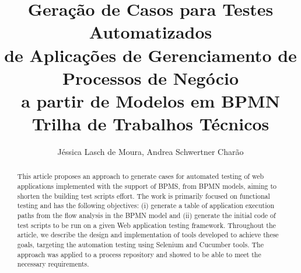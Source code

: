 \documentclass[12pt]{article}
\title{Geração de Casos para Testes Automatizados\\ de Aplicações de Gerenciamento de Processos de Negócio\\ a partir de Modelos em BPMN\\\vspace{0.5cm} \small{Trilha de Trabalhos Técnicos}}
\author{Jéssica Lasch de Moura\inst{1}, Andrea Schwertner Charão\inst{1}}
\begin{document}
 

\maketitle

\begin{abstract}


This article proposes an approach to generate cases for automated testing of web applications implemented with the support of BPMS, from BPMN models, aiming to shorten the building test scripts effort. The work is primarily focused on functional testing and has the following objectives: (i) generate a table of application execution paths from the flow analysis in the BPMN model and (ii) generate the initial code of test scripts to be run on a given Web application testing framework.
Throughout the article, we describe the design and implementation of tools developed to achieve these goals, targeting the automation testing using Selenium and Cucumber tools. The approach was applied to a process repository and showed to be able to meet the necessary requirements.
\end{abstract}
     
\end{document}
